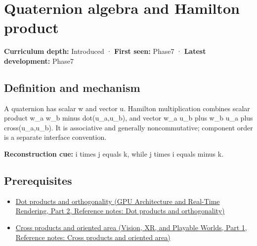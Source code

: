 \hypertarget{appendix-965d9260eeab}{}\label{referencestart:appendix-965d9260eeab}
\section{Quaternion algebra and Hamilton product}\label{appendix-965d9260eeab-quaternion-algebra-and-hamilton-product}

\hypertarget{appendix-965d9260eeab-quaternion-algebra-and-hamilton-product}{}

\textbf{Curriculum depth:} Introduced · \textbf{First seen:} Phase7 · \textbf{Latest development:} Phase7

\begin{allmightroledefinition}

\subsection{Definition and mechanism}\label{appendix-965d9260eeab-definition-and-mechanism}

\hypertarget{appendix-965d9260eeab-definition-and-mechanism}{}

A quaternion has scalar w and vector u. Hamilton multiplication combines scalar product w\_a w\_b minus dot(u\_a,u\_b), and vector w\_a u\_b plus w\_b u\_a plus cross(u\_a,u\_b). It is associative and generally noncommutative; component order is a separate interface convention.

\end{allmightroledefinition}

\textbf{Reconstruction cue:} i times j equals k, while j times i equals minus k.

\subsection{Prerequisites}\label{appendix-965d9260eeab-prerequisites}

\hypertarget{appendix-965d9260eeab-prerequisites}{}

\begin{itemize}
\tightlist
\item
  \href{../06-GPU-Architecture-and-Real-Time-Rendering-P02/main.pdf\#nameddest=appendix-8bc4e8fc547c}{Dot products and orthogonality (GPU Architecture and Real-Time Rendering, Part 2, Reference notes: Dot products and orthogonality)}
\item
  \href{../07-Vision-XR-and-Playable-Worlds-P01/main.pdf\#nameddest=appendix-2391db8052b1}{Cross products and oriented area (Vision, XR, and Playable Worlds, Part 1, Reference notes: Cross products and oriented area)}
\end{itemize}

